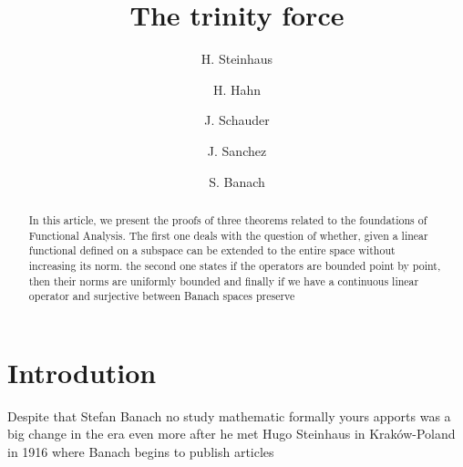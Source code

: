 \documentclass{article}
\title{The trinity force}
\author{H. Steinhaus \and 
 H. Hahn \and
 J. Schauder \and 
 J. Sanchez \and S. Banach}
\begin{document}
\maketitle

\begin{abstract}
In this article, we present the proofs of three theorems related to the foundations of Functional Analysis. The first one deals with 
the question of whether, given a linear functional defined on a subspace can be extended to the entire space without increasing its norm.
the second one states if the operators are bounded point by point, then their norms are uniformly bounded and finally if we have a continuous linear operator
and surjective  between  Banach spaces preserve 

\end{abstract}

\section{Introdution}
Despite that Stefan Banach no study mathematic formally yours apports was a big change in the era
even more after he met Hugo Steinhaus in Kraków-Poland in 1916 where Banach begins to publish articles 
\end{document}
